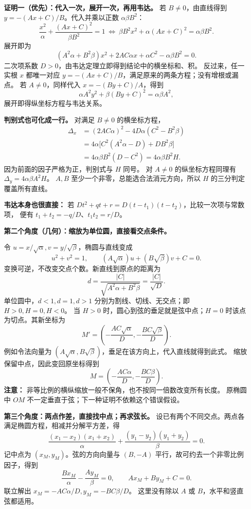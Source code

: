 \clearpage
\begin{proofbox}
\textbf{证明一（优先）：代入一次，展开一次，再用韦达。}
若 $B\ne0$，由直线得到 $y=-(Ax+C)/B$。代入并乘以正数 $\alpha\beta B^2$：
\[
 \frac{x^2}{\alpha}+\frac{(Ax+C)^2}{\beta B^2}=1
 \ \Longleftrightarrow\
 \beta B^2x^2+\alpha(Ax+C)^2=\alpha\beta B^2.
\]
展开即为
\[
 (A^2\alpha+B^2\beta)x^2+2AC\alpha x+\alpha C^2-\alpha\beta B^2=0.
\]
二次项系数 $D>0$，由韦达定理立即得到结论中的横坐标和、积。
反过来，任一实根 $x$ 都唯一对应 $y=-(Ax+C)/B$，满足原来的两条方程；没有增根或漏点。
若 $A\ne0$，同样代入 $x=-(By+C)/A$，得到
\[
 \alpha A^2y^2+\beta(By+C)^2=\alpha\beta A^2,
\]
展开即得纵坐标方程与韦达关系。

\textbf{判别式也可化成一行。} 对满足 $B\ne0$ 的横坐标方程，
\[
\begin{aligned}
 \Delta_x
 &=(2AC\alpha)^2-4D\alpha(C^2-B^2\beta)\\
 &=4\alpha\bigl[C^2(A^2\alpha-D)+DB^2\beta\bigr]\\
 &=4\alpha\beta B^2(D-C^2)=4\alpha\beta B^2H.
\end{aligned}
\]
因为前面的因子严格为正，判别式与 $H$ 同号。
对 $A\ne0$ 的纵坐标方程同理有 $\Delta_y=4\alpha\beta A^2H$。
$A,B$ 至少一个非零，总能选合法消元方向，所以 $H$ 的三分判定覆盖所有直线。

\textbf{韦达本身也很直接：} 若 $Dt^2+qt+r=D(t-t_1)(t-t_2)$，比较一次项与常数项，
便有 $t_1+t_2=-q/D$、$t_1t_2=r/D$。

\tcbbreak
\textbf{第二个角度（几何）：缩放为单位圆，直接看交点条件。}

令 $u=x/\sqrt\alpha,v=y/\sqrt\beta$，椭圆与直线变成
\[
 u^2+v^2=1,\qquad (A\sqrt\alpha)u+(B\sqrt\beta)v+C=0.
\]
变换可逆，不改变交点个数。新直线到原点的距离为
\[
 d=\frac{|C|}{\sqrt{A^2\alpha+B^2\beta}}=\frac{|C|}{\sqrt D}.
\]
单位圆中，$d<1,d=1,d>1$ 分别为割线、切线、无交点；即 $H>0,H=0,H<0$。
当 $H>0$ 时，圆心到弦的垂足就是弦中点；$H=0$ 时该点为切点。其新坐标为
\[
 M'=\left(-\frac{AC\sqrt\alpha}{D},-\frac{BC\sqrt\beta}{D}\right).
\]
例如令法向量为 $(A\sqrt\alpha,B\sqrt\beta)$，垂足在该方向上，代入直线就得到此式。
缩放保留中点，因此变回原坐标得到
\[
 M=\left(-\frac{AC\alpha}{D},-\frac{BC\beta}{D}\right).
\]
\textbf{注意：} 非等比例的横纵缩放一般不保角，也不按同一倍数改变所有长度。
原椭圆中 $OM$ 不一定垂直于弦；下一种证明不依赖这个错误假设。

\tcbbreak
\textbf{第三个角度：两点作差，直接找中点；再求弦长。}
设已有两个不同交点。两点各满足椭圆方程，相减并分解平方差，得
\[
 \frac{(x_1-x_2)(x_1+x_2)}{\alpha}
 +\frac{(y_1-y_2)(y_1+y_2)}{\beta}=0.
\]
记中点为 $(x_M,y_M)$。弦的方向向量与 $(B,-A)$ 平行，故可约去一个非零比例因子，得到
\[
 \frac{B x_M}{\alpha}-\frac{A y_M}{\beta}=0,\qquad
 Ax_M+By_M+C=0.
\]
联立解出 $x_M=-AC\alpha/D,y_M=-BC\beta/D$。
这里没有除以 $A$ 或 $B$，水平和竖直弦都适用。


\end{proofbox}
